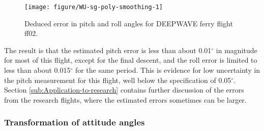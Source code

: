 \documentclass[12pt,twoside,english]{article}\usepackage[]{graphicx}\usepackage[]{color}
\newenvironment{knitrout}{}{} %
\begin{document}
\begin{knitrout}\footnotesize
{}\color{fgcolor}\begin{figure}

{\centering \texttt{[image: figure/WU-sg-poly-smoothing-1]} 

}

\caption[Deduced error in pitch and roll angles for DEEPWAVE ferry flight ff02]{Deduced error in pitch and roll angles for DEEPWAVE ferry flight ff02.}\label{fig:sg-poly-smoothing}
\end{figure}


\end{knitrout}

The result is that the estimated pitch error is less than about 0.01$^{\circ}$ in magnitude for most of this flight, except for the final descent, and the roll error is limited to less than about 0.015$^{\circ}$ for the same period. This is evidence for low uncertainty in the pitch measurement for this flight, well below the specification of 0.05$^{\circ}$. Section \ref{sub:Application-to-research} contains further discussion of the errors from the research flights, where the estimated errors sometimes can be larger. 


\subsubsection{Transformation of attitude angles\label{sub:angle-transforms-for-pitch-correction}}
\end{document}
